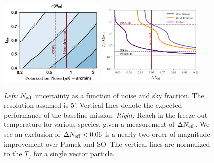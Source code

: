 \documentclass[PICOReport.tex]{subfiles}
\begin{document}
\begin{figure}[t!]
\begin{center}
\includegraphics[width=0.45\textwidth]{images/Neff_final.pdf}
\includegraphics[width=0.47\textwidth]{images/Tf_pico.pdf}
\vspace{-0.15in}
\caption{ \small \setlength{\baselineskip}{0.95\baselineskip}
\textit{Left:} ${N_{\rm eff}}$ uncertainty as a function of noise and sky fraction. The resolution assumed is 5'.   Vertical lines denote the expected performance of the baseline mission. \textit{Right:} Reach in the freeze-out temperature for various species, given a measurement of $\Delta {N_{\rm eff}}$.  We see an exclusion of $\Delta {N_{\rm eff}} < 0.06$ is a nearly two order of magnitude improvement over Planck and SO.  The vertical lines are normalized to the $T_f$ for a single vector particle.
\label{fig:Neff_future} }
\end{center}
\vspace{-0.15in}
\end{figure}
\end{document}
